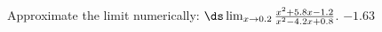 {Approximate  the limit numerically: 
$\ds \lim_{x\to 0.2} \frac{x^2+5.8 x-1.2}{x^2-4.2 x+0.8}$.
}
{$-1.63$
}


